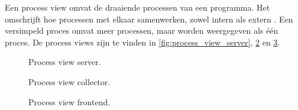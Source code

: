 \documentclass[../views.tex]{subfiles}
\begin{document}
Een process view omvat de draaiende processen van een programma. Het omschrijft hoe processen met elkaar samenwerken, zowel intern als extern \parencite{architectural_blueprints}. Een versimpeld proces omvat meer processen, maar worden weergegeven als één proces. De process views zijn te vinden in \autoref{fig:process_view_server}, \ref{fig:process_view_collector} en \ref{fig:process_view_frontend}.

\begin{figure}[ht]
  \centering
  \caption{Process view server.}
  \label{fig:process_view_server}
\end{figure}

\begin{figure}[ht]
  \centering
  \caption{Process view collector.}
  \label{fig:process_view_collector}
\end{figure}

\begin{figure}[ht]
  \centering
  \caption{Process view frontend.}
  \label{fig:process_view_frontend}
\end{figure}
\end{document}
